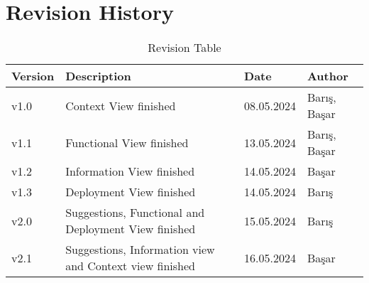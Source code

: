 \chapter*{Revision History}
 
 \begin{table}[h] 
 \centering
 \begin{tabularx}{0.8\textwidth}{|X|X|X|X|}
 \hline
Version & Description & Date & Author  \\ \hline
v1.0 & Context View finished & 08.05.2024  & Barış, Başar    \\ \hline
v1.1 & Functional View finished  & 13.05.2024  & Barış, Başar  \\ \hline
v1.2 & Information View finished  & 14.05.2024  & Başar   \\ \hline
v1.3 & Deployment View finished  & 14.05.2024  & Barış   \\ \hline
v2.0 & Suggestions, Functional and Deployment View finished  & 15.05.2024  & Barış   \\ \hline
v2.1 & Suggestions, Information view and Context view finished  & 16.05.2024  & Başar   \\ \hline
\end{tabularx}
\caption{Revision Table \label{Tab:revision}}

\end{table}
